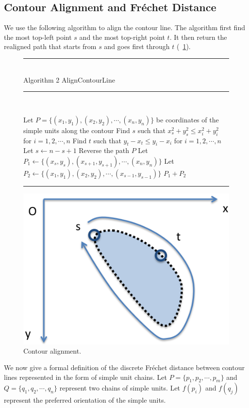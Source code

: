 \documentclass[10pt,letterpaper]{article}
\newenvironment{myalgorithm}[1]%
{\begin{figure}[!h]\small\noindent\rule{\linewidth}{1pt}\\#1\vspace{-0.5em}\\%
\rule{\linewidth}{0.5pt}\\\vspace{-1em}}%
{\vspace{-0.5em}\rule{\linewidth}{1pt}\end{figure}}
\begin{document}
\subsection{Contour Alignment and Fr\'echet Distance}

We use the following algorithm to align the contour line.
The algorithm first find the most top-left point $s$
and the most top-right point $t$.
It then return the realigned path that starts from $s$ and goes first through $t$
(\figurename~\ref{fig:7}).

\begin{myalgorithm}{Algorithm 2 AlignContourLine}
\begin{algorithmic}[1]
\STATE Let $P=\{(x_1,y_1),(x_2,y_2),\cdots,(x_n,y_n)\}$ be coordinates of the simple units along the contour
\STATE Find $s$ such that $x_s^2+y_s^2\le x_i^2+y_i^2$ for $i=1,2,\cdots,n$
\STATE Find $t$ such that $y_t-x_t\le y_i-x_i$ for $i=1,2,\cdots,n$
  \STATE Let $s\leftarrow n - s + 1$
  \STATE Reverse the path $P$
\ENDIF
\STATE Let $P_1\leftarrow\{(x_s,y_s),(x_{s+1},y_{s+1}),\cdots,(x_n,y_n)\}$
\STATE Let $P_2\leftarrow\{(x_1,y_1),(x_2,y_2),\cdots,(x_{s-1},y_{s-1})\}$
\RETURN $P_1 + P_2$
\end{algorithmic}
\end{myalgorithm}

\begin{figure}[ht]
\begin{center}
\includegraphics[width=0.5\linewidth]{images/fig7.png}
\end{center}
\caption{Contour alignment.} 
\label{fig:7}
\end{figure}

We now give a formal definition of the discrete Fr\'echet distance between 
contour lines represented in the form of simple unit chains.
Let $P=\{p_1,p_2,\cdots,p_m\}$ and $Q=\{q_1,q_2,\cdots,q_n\}$ represent two chains of simple units.
Let $f(p_i)$ and $f(q_j)$ represent the preferred orientation of the simple units.
\end{document}
